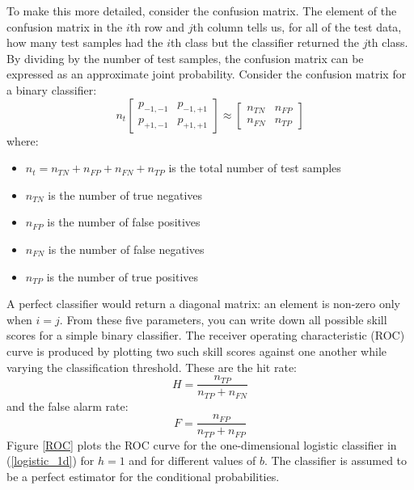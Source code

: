 \documentclass{article}
\begin{document}
To make this more detailed, consider the confusion matrix.
The element of the confusion matrix in the $i$th row and $j$th column tells
us, for all of the test data, how many test samples had the $i$th class but the
classifier returned the $j$th class.
By dividing by the number of test samples, the confusion matrix can be
expressed as an approximate joint probability.
Consider the confusion matrix for a binary classifier:
\begin{equation}
	n_t \left [ \begin{array}{ll}
			p_{-1,-1} & p_{-1,+1} \\
			p_{+1,-1} & p_{+1,+1}
		\end{array} \right ]
		\approx
		\left [ \begin{array}{ll}
				n_{TN} & n_{FP} \\
				n_{FN} & n_{TP}
		\end{array} \right ]
\end{equation}
where:
\begin{itemize}
	\item $n_t=n_{TN}+n_{FP}+n_{FN}+n_{TP}$ is the total number of test samples
	\item $n_{TN}$ is the number of true negatives
	\item $n_{FP}$ is the number of false positives
	\item $n_{FN}$ is the number of false negatives
	\item $n_{TP}$ is the number of true positives
\end{itemize}
A perfect classifier would return a diagonal matrix: 
an element is non-zero only when $i=j$.
From these five parameters, you can write down all possible skill scores
for a simple binary classifier.
The receiver operating characteristic (ROC) curve is produced by plotting
two such skill scores against one another while varying the classification
threshold.
These are the hit rate:
\begin{equation}
	H = \frac{n_{TP}}{n_{TP} + n_{FN}}
\end{equation}
and the false alarm rate:
\begin{equation}
	F = \frac{n_{FP}}{n_{TP} + n_{FP}}
\end{equation}
Figure \ref{ROC} plots the ROC curve for the one-dimensional logistic classifier
in (\ref{logistic_1d}) for $h=1$ and for different values of $b$.
The classifier is assumed to be a perfect estimator for the conditional
probabilities.
\end{document}
